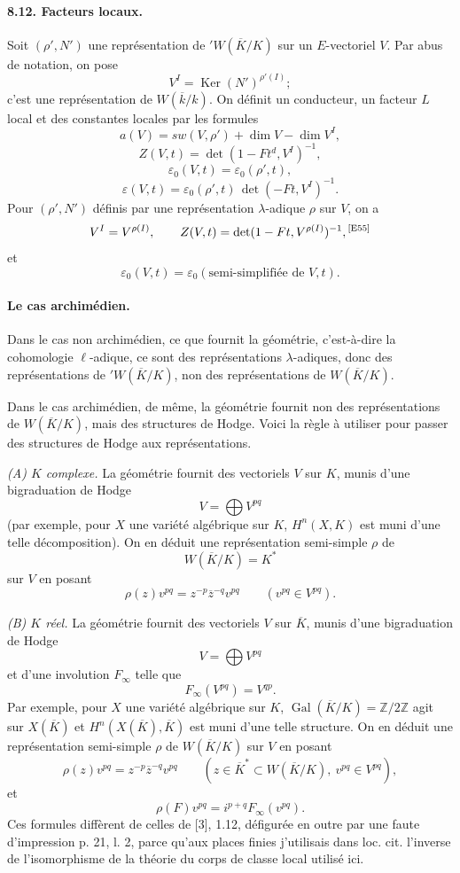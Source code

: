 \documentclass[10pt,letterpaper]{article}
\newcommand{\Z}{\mathbb Z}
\newcommand{\Gal}{\operatorname{Gal}}
\providecommand{\Ker}{\operatorname{Ker}}
\providecommand{\Gal}{\operatorname{Gal}}
\providecommand{\Gal}{\operatorname{Gal}}
\providecommand{\Gal}{\operatorname{Gal}}
\providecommand{\Gal}{\operatorname{Gal}}
\providecommand{\Ker}{\operatorname{Ker}}
\newcommand{\auditmark}[1]{\textsuperscript{\normalfont\scriptsize[E#1]}}
\begin{document}
\paragraph{8.12. Facteurs locaux.} Soit $(\rho',N')$ une représentation de ${}'W(\overline K/K)$ sur un $E$-vectoriel $V$. Par abus de notation, on pose
\[
V^I=\Ker(N')^{\rho'(I)};
\]
c'est une représentation de $W(\overline k/k)$. On définit un conducteur, un facteur $L$ local et des constantes locales par les formules
\[
\tag{8.12.1}
a(V)=sw(V,\rho')+\dim V-\dim V^I,
\]
\[
\tag{8.12.2}
Z(V,t)=\det(1-Ft^d,V^I)^{-1},
\]
\[
\tag{8.12.3}
\varepsilon_0(V,t)=\varepsilon_0(\rho',t),
\]
\[
\tag{8.12.4}
\varepsilon(V,t)=\varepsilon_0(\rho',t)\,\det(-Ft,V^I)^{-1}.
\]
Pour $(\rho',N')$ définis par une représentation $\lambda$-adique $\rho$ sur $V$, on a
\[
V^I=V^{\rho(I)},
\qquad
Z(V,t)=\det(1-Ft,V^{\rho(I)})^{-1},\auditmark{55}
\]
et
\[
\varepsilon_0(V,t)=\varepsilon_0(\text{semi-simplifiée de }V,t).
\]

\paragraph{Le cas archimédien.} Dans le cas non archimédien, ce que fournit la géométrie, c'est-à-dire la cohomologie $\ell$-adique, ce sont des représentations $\lambda$-adiques, donc des représentations de ${}'W(\overline K/K)$, non des représentations de $W(\overline K/K)$.

Dans le cas archimédien, de même, la géométrie fournit non des représentations de $W(\overline K/K)$, mais des structures de Hodge. Voici la règle à utiliser pour passer des structures de Hodge aux représentations.

\emph{(A) $K$ complexe.} La géométrie fournit des vectoriels $V$ sur $K$, munis d'une bigraduation de Hodge
\[
V=\bigoplus V^{pq}
\]
(par exemple, pour $X$ une variété algébrique sur $K$, $H^n(X,K)$ est muni d'une telle décomposition). On en déduit une représentation semi-simple $\rho$ de
\[
W(\overline K/K)=K^*
\]
sur $V$ en posant
\[
\rho(z)v^{pq}=z^{-p}\overline z^{-q}v^{pq}\qquad(v^{pq}\in V^{pq}).
\]

\emph{(B) $K$ réel.} La géométrie fournit des vectoriels $V$ sur $\overline K$, munis d'une bigraduation de Hodge
\[
V=\bigoplus V^{pq}
\]
et d'une involution $F_\infty$ telle que
\[
F_\infty(V^{pq})=V^{qp}.
\]
Par exemple, pour $X$ une variété algébrique sur $K$, $\Gal(\overline K/K)=\Z/2\Z$ agit sur $X(\overline K)$ et $H^n(X(\overline K),\overline K)$ est muni d'une telle structure. On en déduit une représentation semi-simple $\rho$ de $W(\overline K/K)$ sur $V$ en posant
\[
\rho(z)v^{pq}=z^{-p}\overline z^{-q}v^{pq}\qquad(z\in\overline K^*\subset W(\overline K/K),\ v^{pq}\in V^{pq}),
\]
et
\[
\rho(F)v^{pq}=i^{p+q}F_\infty(v^{pq}).
\]
Ces formules diffèrent de celles de [3], 1.12, défigurée en outre par une faute d'impression p. 21, l. 2, parce qu'aux places finies j'utilisais dans loc. cit. l'inverse de l'isomorphisme de la théorie du corps de classe local utilisé ici.
\end{document}
